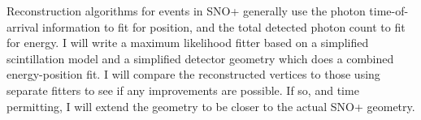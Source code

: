 \documentclass{article}
\begin{document}
Reconstruction algorithms for events in SNO+ generally use the photon
time-of-arrival information to fit for position, and the total
detected photon count to fit for energy.  I will write a maximum
likelihood fitter based on a simplified scintillation model and a
simplified detector geometry which does a combined energy-position
fit.  I will compare the reconstructed vertices to those using
separate fitters to see if any improvements are possible.  If so, and
time permitting, I will extend the geometry to be closer to the actual
SNO+ geometry.
\end{document}
